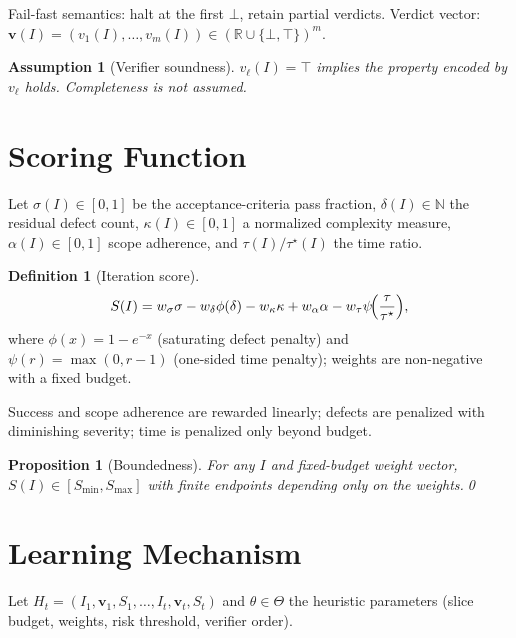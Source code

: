 \documentclass[10pt,twocolumn,letterpaper]{article}
\theoremstyle{definition}
\newtheorem{definition}{Definition}[section]
\theoremstyle{plain}
\newtheorem{proposition}{Proposition}[section]
\newtheorem{assumption}{Assumption}[section]
\newcommand{\R}{\mathbb{R}}
\newcommand{\Nat}{\mathbb{N}}
\begin{document}
Fail-fast semantics: halt at the first $\bot$, retain partial verdicts.
Verdict vector:
$\mathbf{v}(I)=(v_1(I),\dots,v_m(I))\in(\R\cup\{\bot,\top\})^m$.

\begin{assumption}[Verifier soundness]\label{ass:sound}
$v_\ell(I)=\top$ implies the property encoded by $v_\ell$ holds.
Completeness is not assumed.
\end{assumption}

\section{Scoring Function}\label{sec:scoring}

Let $\sigma(I)\in[0,1]$ be the acceptance-criteria pass fraction,
$\delta(I)\in\Nat$ the residual defect count,
$\kappa(I)\in[0,1]$ a normalized complexity measure,
$\alpha(I)\in[0,1]$ scope adherence, and
$\tau(I)/\tau^\star(I)$ the time ratio.

\begin{definition}[Iteration score]\label{def:score}
\begin{equation}\label{eq:score}
S(I)=
  w_\sigma\sigma
 -w_\delta\phi(\delta)
 -w_\kappa\kappa
 +w_\alpha\alpha
 -w_\tau\psi\!\Bigl(\frac{\tau}{\tau^\star}\Bigr),
\end{equation}
where $\phi(x)=1-e^{-x}$ (saturating defect penalty) and
$\psi(r)=\max(0,r\!-\!1)$ (one-sided time penalty); weights are
non-negative with a fixed budget.
\end{definition}

Success and scope adherence are rewarded linearly; defects are
penalized with diminishing severity; time is penalized only beyond
budget.

\begin{proposition}[Boundedness]\label{prop:bounded}
For any $I$ and fixed-budget weight vector,
$S(I)\in[S_{\min},S_{\max}]$ with finite endpoints depending only on
the weights.\qed
\end{proposition}

\section{Learning Mechanism}\label{sec:learning}

Let $H_t=(I_1,\mathbf{v}_1,S_1,\dots,I_t,\mathbf{v}_t,S_t)$ and
$\theta\in\Theta$ the heuristic parameters (slice budget, weights,
risk threshold, verifier order).
\end{document}
